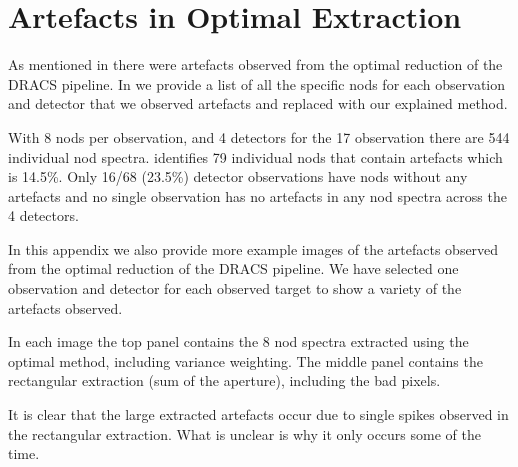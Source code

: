 
\chapter{Artefacts in Optimal Extraction} %
\label{appendix:artefacts}



As mentioned in  there were artefacts observed from the optimal reduction of the {DRACS} pipeline. In  we provide a list of all the specific nods for each observation and detector that we observed artefacts and replaced with our explained method.

With 8 nods per observation, and 4 detectors for the 17 observation there are 544 individual nod spectra.  identifies 79 individual nods that contain artefacts which is 14.5\%. Only 16/68 (23.5\%) detector observations have nods without any artefacts and no single observation has no artefacts in any nod spectra across the 4 detectors.


In this appendix we also provide more example images of the artefacts observed from the optimal reduction of the {DRACS} pipeline. We have selected one observation and detector for each observed target to show a variety of the artefacts observed.

In each image the top panel contains the 8 nod spectra extracted using the optimal method, including variance weighting. The middle panel contains the rectangular extraction (sum of the aperture), including the bad pixels.

It is clear that the large extracted artefacts occur due to single spikes observed in the rectangular extraction. What is unclear is why it only occurs some of the time.



